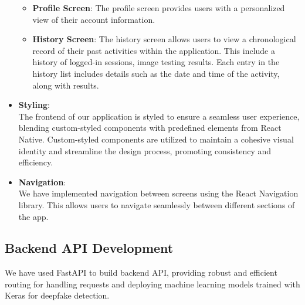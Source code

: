 \begin{itemize}
\begin{itemize}
        \item \textbf{Profile Screen}: The profile screen provides users with a personalized view of their account information.

        \item \textbf{History Screen}: The history screen allows users to view a chronological record of their past activities within the application. This include a history of logged-in sessions, image testing results. Each entry in the history list includes details such as the date and time of the activity, along with results.
    \end{itemize}

    \item \textbf{Styling}:\\
          The frontend of our application is styled to ensure a seamless user experience, blending custom-styled components with predefined elements from React Native. Custom-styled components are utilized to maintain a cohesive visual identity and streamline the design process, promoting consistency and efficiency.

          \item\textbf{Navigation}:\\
          We have implemented navigation between screens using the React Navigation library. This allows users to navigate seamlessly between different sections of the app.
\end{itemize}

\subsection{Backend API Development}

We have used FastAPI to build backend API, providing robust and efficient routing for handling requests and deploying machine learning models trained with Keras for deepfake detection.

